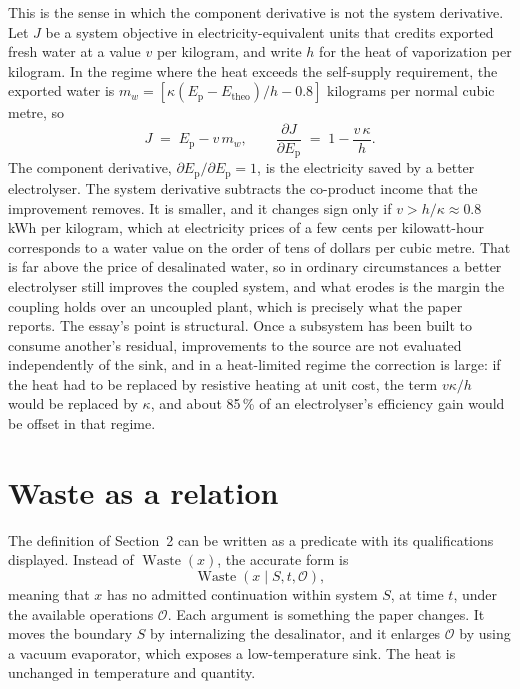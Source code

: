 \documentclass[11pt]{article}
\theoremstyle{definition}
\theoremstyle{remark}
\newcommand{\Ep}{E_{\mathrm{p}}}
\newcommand{\Et}{E_{\mathrm{theo}}}
\begin{document}
This is the sense in which the component derivative is not the system derivative. Let $J$ be a system objective in electricity-equivalent units that credits exported fresh water at a value $v$ per kilogram, and write $h$ for the heat of vaporization per kilogram. In the regime where the heat exceeds the self-supply requirement, the exported water is $m_w=[\kappa(\Ep-\Et)/h-0.8]$ kilograms per normal cubic metre, so
\begin{equation}
  J \;=\; \Ep - v\,m_w, \qquad
  \frac{\partial J}{\partial \Ep} \;=\; 1-\frac{v\,\kappa}{h}.
  \label{eq:derivative}
\end{equation}
The component derivative, $\partial \Ep/\partial \Ep=1$, is the electricity saved by a better electrolyser. The system derivative subtracts the co-product income that the improvement removes. It is smaller, and it changes sign only if $v>h/\kappa\approx0.8$\,kWh per kilogram, which at electricity prices of a few cents per kilowatt-hour corresponds to a water value on the order of tens of dollars per cubic metre. That is far above the price of desalinated water, so in ordinary circumstances a better electrolyser still improves the coupled system, and what erodes is the margin the coupling holds over an uncoupled plant, which is precisely what the paper reports. The essay's point is structural. Once a subsystem has been built to consume another's residual, improvements to the source are not evaluated independently of the sink, and in a heat-limited regime the correction is large: if the heat had to be replaced by resistive heating at unit cost, the term $v\kappa/h$ would be replaced by $\kappa$, and about 85\,\% of an electrolyser's efficiency gain would be offset in that regime.

\section{Waste as a relation}

The definition of Section~2 can be written as a predicate with its qualifications displayed. Instead of $\operatorname{Waste}(x)$, the accurate form is
\[
  \operatorname{Waste}(x\mid S,t,\mathcal{O}),
\]
meaning that $x$ has no admitted continuation within system $S$, at time $t$, under the available operations $\mathcal{O}$. Each argument is something the paper changes. It moves the boundary $S$ by internalizing the desalinator, and it enlarges $\mathcal{O}$ by using a vacuum evaporator, which exposes a low-temperature sink. The heat is unchanged in temperature and quantity.
\end{document}
